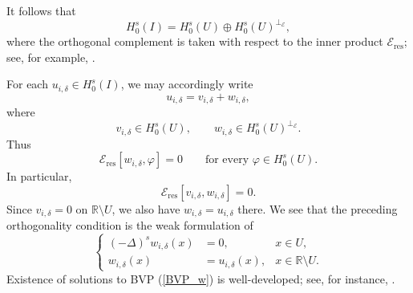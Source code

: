 \documentclass[preprint,12pt]{elsarticle}
\newcommand{\R}{\mathbb R}
\begin{document}
It follows that
\[
    H_0^s(I)
    =
    H_0^s(U)\oplus H_0^s(U)^{\perp_{\mathcal E}},
\]
where the orthogonal complement is taken with respect to the inner
product $\mathcal E_{\mathrm{res}}$; see, for example, \cite[Sec.~3.3, Thm.~3.3-4]{Krey}.

For each $u_{i,\delta}\in H_0^s(I)$, we may accordingly write
\[
    u_{i,\delta}
    =
    v_{i,\delta}+w_{i,\delta},
\]
where
\[
    v_{i,\delta}\in H_0^s(U),
    \qquad
    w_{i,\delta}\in H_0^s(U)^{\perp_{\mathcal E}}.
\]
Thus
\[
    \mathcal E_{\mathrm{res}}[w_{i,\delta},\varphi]=0
    \qquad
    \text{for every }\varphi\in H_0^s(U).
\]
In particular,
\[
    \mathcal E_{\mathrm{res}}[v_{i,\delta},w_{i,\delta}]=0.
\]
Since $v_{i,\delta}=0$ on $\R\setminus U$, we also have
$w_{i,\delta}=u_{i,\delta}$ there. We see that the preceding orthogonality condition is the weak formulation of
\begin{equation}\label{BVP_w}
 \left\{
 \begin{aligned}
        (-\Delta)^s w_{i,\delta}(x)&=0, &x\in U,\\
        w_{i,\delta}(x)&=u_{i,\delta}(x), &x\in\R\setminus U.
 \end{aligned}
 \right.
\end{equation}
Existence of solutions to BVP (\ref{BVP_w}) is well-developed; see, for instance, \cite[Sec. 3]{RO}. 
\end{document}
